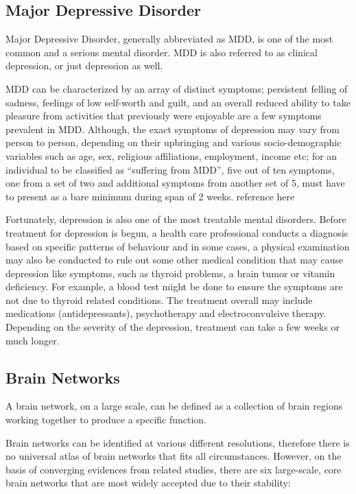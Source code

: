 \documentclass{article}
\begin{document}
\subsection{Major Depressive Disorder}

Major Depressive Disorder, generally abbreviated as MDD, is one of the
most common and a serious mental disorder. MDD is also referred to as
clinical depression, or just depression as well.

MDD can be characterized by an array of distinct symptoms; persistent
felling of sadness, feelings of low self-worth and guilt, and an
overall reduced ability to take pleasure from activities that
previously were enjoyable are a few symptoms prevalent in MDD.
Although, the exact symptoms of depression may vary from person to
person, depending on their upbringing and various socio-demographic
variables such as age, sex, religious affiliations, employment, income
etc; for an individual to be classified as ``suffering from MDD'',
five out of ten symptoms, one from a set of two and %
additional symptoms from another set of 5, must have to %
present as a bare minimum during span of 2 weeks.  %
reference here

Fortunately, depression is also one of the most treatable mental
disorders. Before treatment for depression is begun, a health care
professional conducts a diagnosis based on specific patterns of
behaviour and in some cases, a physical examination may also be
conducted to rule out some other medical condition that may cause
depression like symptoms, such as thyroid problems, a brain tumor or
vitamin deficiency. For example, a blood test might be done to ensure
the symptoms are not due to thyroid related conditions. The treatment
overall may include medications (antidepressants), psychotherapy and
electroconvulsive therapy. Depending on the severity of the
depression, treatment can take a few weeks or much longer.

\subsection{Brain Networks}

A brain network, on a large scale, can be defined as a collection of
brain regions working together to produce a specific function.

Brain networks can be identified at various different resolutions,
therefore there is no universal atlas of brain networks that fits all
circumstances. However, on the basis of converging evidences from
related studies, there are six large-scale, core brain networks that
are most widely accepted due to their stability:
\end{document}
